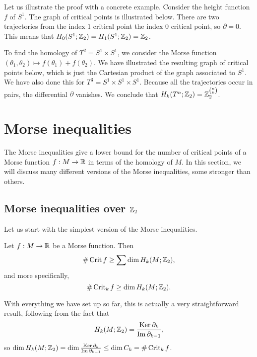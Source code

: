\begin{eg}
    Let us illustrate the proof with a concrete example.
    Consider the height function $f$ of $S^{1}$. The graph of critical points is illustrated below.
    There are two trajectories from the index $1$ critical point the index $0$ critical point, so $\partial = 0$. This means that $H_0(S^{1}; \mathbb{Z}_2) = H_1(S^{1}; \mathbb{Z}_2) = \mathbb{Z}_2$.

    To find the homology of $T^2 = S^{1} \times S^{1}$, we consider the Morse function $(\theta_1, \theta_2) \mapsto f(\theta_1) + f(\theta_2)$.
    We have illustrated the resulting graph of critical points below, which is just the Cartesian product of the graph associated to $S^{1}$. 
    We have also done this for $T^{3} = S^{1} \times S^{1} \times S^{1}$.
    Because all the trajectories occur in pairs, the differential $\partial$ vanishes. We conclude that $H_k(T^{n}; \mathbb{Z}_2) = \mathbb{Z}_2^{\binom{n}{k}}$.
\begin{figure}[H]
    \centering
\end{figure}
\end{eg}


\section{Morse inequalities}
The Morse inequalities give a lower bound for the number of critical points of a Morse function $f:M \to  \mathbb{R}$ in terms of the homology of $M$.
In this section, we will discuss many different versions of the Morse inequalities, some stronger than others.

\subsection{Morse inequalities over $\mathbb{Z}_2$}
Let us start with the simplest version of the Morse inequalities.

\begin{theorem}
    Let $f: M \to  \mathbb{R}$ be a Morse function. Then
    \[
        \# \operatorname{Crit} f \ge \sum \dim H_k(M; \mathbb{Z}_2)
    ,\]
    and more specifically,
    \[
        \# \operatorname{Crit}_k f \ge \dim H_k(M; \mathbb{Z}_2)
    .\]
\end{theorem}
\begin{myproof}
    With everything we have set up so far, this is actually a very straightforward result, following from the fact that \[
    H_k(M; \mathbb{Z}_2) = \frac{\operatorname{Ker} \partial_k}{\operatorname{Im} \partial_{k-1}},
    \] so $\dim H_k(M; \mathbb{Z}_2) = \dim \frac{\operatorname{Ker} \partial_k}{\operatorname{Im} \partial_{k-1}} \le  \dim C_k = \# \operatorname{Crit}_k f$.
\end{myproof}

